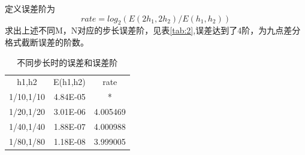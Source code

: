\documentclass[withoutpreface,bwprint]{cumcmthesis} %
\begin{document}
	定义误差阶为
	$$rate=log_{2}(E(2h_{1},2h_{2})/E(h_{1},h_{2}))$$
	求出上述不同M，N对应的步长误差阶，见表\ref{tab:2},误差达到了4阶，为九点差分格式截断误差的阶数。
	\begin{table}[htbp]
		\centering
		\caption{不同步长时的误差和误差阶}
		\begin{tabular}{crr}
			\multirow{2}[0]{*}{h1,h2} & \multicolumn{1}{c}{\multirow{2}[0]{*}{E(h1,h2)}} & \multicolumn{1}{c}{\multirow{2}[0]{*}{rate}} \\
			&       &  \\
			1/10,1/10 & 4.84E-05 & \multicolumn{1}{c}{*} \\
			1/20,1/20 & 3.01E-06 & 4.005469 \\
			1/40,1/40 & 1.88E-07 & 4.000988 \\
			1/80,1/80 & 1.18E-08 & 3.999005 \\
		\end{tabular}%
		\label{tab:addlabel}%
	\end{table}%
	
	
\end{document}
